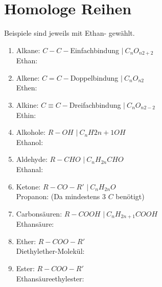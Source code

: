 \section{Homologe Reihen}
Beispiele sind jeweils mit Ethan- gewählt.
\begin{enumerate}
    \item Alkane: $C-C-$Einfachbindung $|\ C_nO_{n2 + 2}$ \\
        Ethan: 


    \item Alkene: $C=C-$Doppelbindung $|\ C_nO_{n2}$ \\
        Ethen:


    \item Alkine: $C\equiv C-$Dreifachbindung $|\ C_nO_{n2 - 2}$ \\
        Ethin: 


    \item Alkohole: $R-OH$ $|\ C_nH{2n+1}OH$\\
        Ethanol:


    \item Aldehyde: $R-CHO$ $|\ C_nH_{2n}CHO$ \\
        Ethanal: 


    \item Ketone: $R-CO-R'$ $|\ C_nH_{2n}O$ \\
        Propanon: (Da mindestens 3 $C$ benötigt)


    \item Carbonsäuren: $R-COOH$ $|\ C_nH_{2n+1}COOH$ \\
        Ethansäure: 


    \item Ether: $R-COO-R'$ \\
        Diethylether-Molekül:


    \item Ester: $R-COO-R'$ \\
        Ethansäureethylester:


\end{enumerate}

